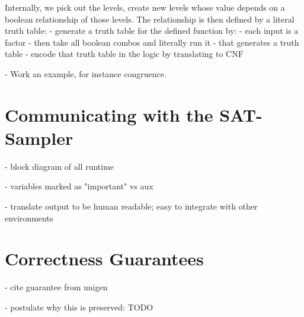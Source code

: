 Internally, we pick out the levels, create new levels whose value depends on a boolean relationship of those levels. The relationship is then defined by a literal truth table:
- generate a truth table for the defined function by:
- each input is a factor
- then take all boolean combos and literally run it
- that generates a truth table
- encode that truth table in the logic by translating to CNF

- Work an example, for instance congruence.

\section{Communicating with the SAT-Sampler}

- block diagram of all runtime

- variables marked as "important" vs aux

- translate output to be human readable; easy to integrate with other environments


\section{Correctness Guarantees}

- cite guarantee from unigen

- postulate why this is preserved: TODO
